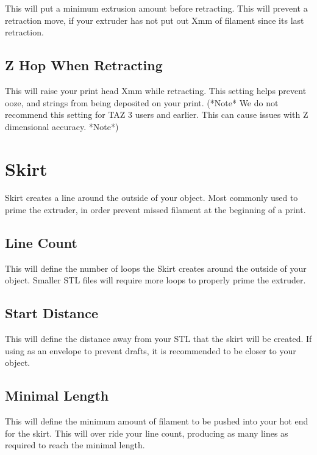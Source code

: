 This will put a minimum extrusion amount before retracting. This will prevent a retraction move, if your extruder has not put out Xmm of filament since its last retraction.

\subsection{Z Hop When Retracting}

This will raise your print head Xmm while retracting. This setting helps prevent ooze, and strings from being deposited on your print. (*Note* We do not recommend this setting for TAZ 3 users and earlier. This can cause issues with Z dimensional accuracy. *Note*)

\section{Skirt}

Skirt creates a line around the outside of your object. Most commonly used to prime the extruder, in order prevent missed filament at the beginning of a print.

\subsection{Line Count}

This will define the number of loops the Skirt creates around the outside of your object. Smaller STL files will require more loops to properly prime the extruder.

\subsection{Start Distance}

This will define the distance away from your STL that the skirt will be created. If using as an envelope to prevent drafts, it is recommended to be closer to your object.

\subsection{Minimal Length}

This will define the minimum amount of filament to be pushed into your hot end for the skirt. This will over ride your line count, producing as many lines as required to reach the minimal length.

